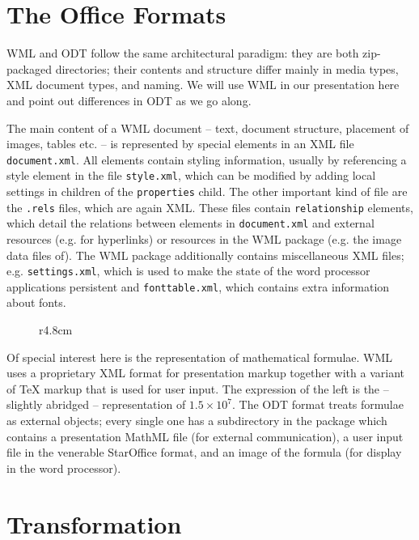 \documentclass{llncs}
\begin{document}
\section{The Office Formats}\label{sec:target}

WML and ODT follow the same architectural paradigm: they are both zip-packaged
directories; their contents and structure differ mainly in media types, XML document
types, and naming. We will use WML in our presentation here and point out differences in
ODT as we go along.

The main content of a WML document -- text, document structure, placement of images,
tables etc. -- is represented by special elements in an XML file
\texttt{document.xml}. All elements contain styling information, usually by referencing a
style element in the file \texttt{style.xml}, which can be modified by adding local
settings in children of the \texttt{properties} child. The other important kind of file
are the \texttt{.rels} files, which are again XML. These files contain
\texttt{relationship} elements, which detail the relations between elements in
\texttt{document.xml} and external resources (e.g. for hyperlinks) or resources in the WML
package (e.g. the image data files of). The WML package additionally contains
miscellaneous XML files; e.g. \texttt{settings.xml}, which is used to make the state of
the word processor applications persistent and \texttt{fonttable.xml}, which contains
extra information about fonts. 

\begin{figure}r{4.8cm}\vspace*{-3em}

\vspace*{-3em}
\end{figure}
Of special interest here is the representation of mathematical formulae. WML uses a
proprietary XML format for presentation markup together with a variant of {\TeX} markup
that is used for user input. The expression of the left is the --slightly abridged --
representation of $1.5\times 10^7$.  The ODT format treats formulae as external objects;
every single one has a subdirectory in the package which contains a presentation MathML
file (for external communication), a user input file in the venerable StarOffice format,
and an image of the formula (for display in the word processor).

\section{Transformation}\label{sec:trans}
\end{document}
